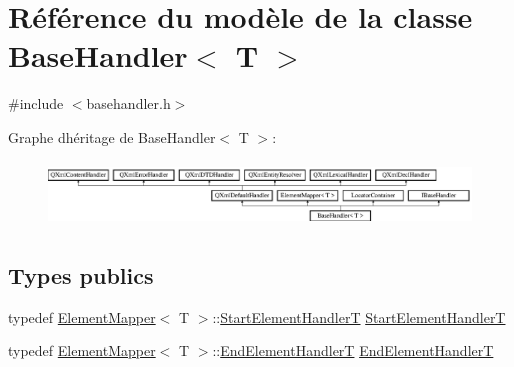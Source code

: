 \hypertarget{class_base_handler}{}\section{Référence du modèle de la classe Base\+Handler$<$ T $>$}
\label{class_base_handler}


{\ttfamily \#include $<$basehandler.\+h$>$}

Graphe d\textquotesingle{}héritage de Base\+Handler$<$ T $>$\+:\begin{figure}[H]
\begin{center}
\leavevmode
\includegraphics[height=1.726619cm]{class_base_handler}
\end{center}
\end{figure}
\subsection*{Types publics}
\begin{DoxyCompactItemize}
\item 
typedef \hyperlink{class_element_mapper}{Element\+Mapper}$<$ T $>$\+::\hyperlink{class_element_mapper_afca37050650c0a9d475f4c87b9189eac}{Start\+Element\+Handler\+T} \hyperlink{class_base_handler_abd6c0f29385e3c9d63d739cd053e2d9b}{Start\+Element\+Handler\+T}
\item 
typedef \hyperlink{class_element_mapper}{Element\+Mapper}$<$ T $>$\+::\hyperlink{class_element_mapper_a3d3ef233834e26837676018b71f5d1aa}{End\+Element\+Handler\+T} \hyperlink{class_base_handler_a3cad3be3bcd3f337d8032d51d555053e}{End\+Element\+Handler\+T}
\end{DoxyCompactItemize}
